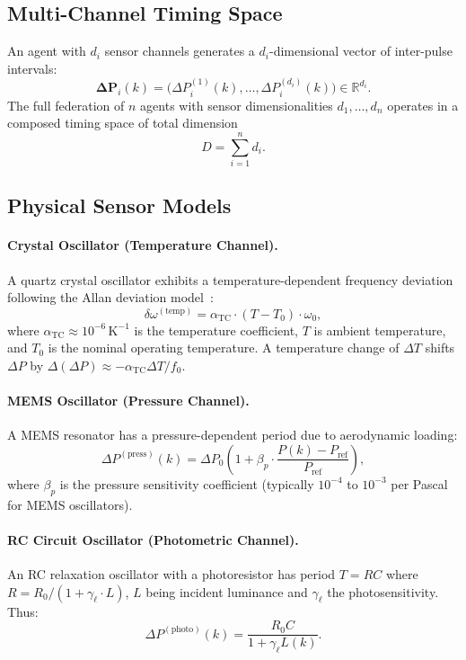 \documentclass[twocolumn,10pt]{article}
\newcommand{\DeltaP}{\Delta P}
\begin{document}
\subsection{Multi-Channel Timing Space}

An agent with $d_i$ sensor channels generates a $d_i$-dimensional vector of
inter-pulse intervals:
\[
  \boldsymbol{\DeltaP}_i(k) =
  \bigl(\DeltaP_i^{(1)}(k), \ldots, \DeltaP_i^{(d_i)}(k)\bigr) \in
  \mathbb{R}^{d_i}.
\]
The full federation of $n$ agents with sensor dimensionalities $d_1, \ldots,
d_n$ operates in a composed timing space of total dimension
\begin{equation}
\label{eq:D}
  D = \sum_{i=1}^{n} d_i.
\end{equation}

\subsection{Physical Sensor Models}

\paragraph{Crystal Oscillator (Temperature Channel).}
A quartz crystal oscillator exhibits a temperature-dependent frequency
deviation following the Allan deviation model~\cite{IEEE1588-2019}:
\[
  \delta\omega^{(\mathrm{temp})} = \alpha_{\mathrm{TC}} \cdot (T - T_0)
  \cdot \omega_0,
\]
where $\alpha_{\mathrm{TC}} \approx 10^{-6}\,\mathrm{K}^{-1}$ is the
temperature coefficient, $T$ is ambient temperature, and $T_0$ is the nominal
operating temperature. A temperature change of $\Delta T$ shifts $\DeltaP$
by $\Delta(\DeltaP) \approx -\alpha_{\mathrm{TC}} \Delta T / f_0$.

\paragraph{MEMS Oscillator (Pressure Channel).}
A MEMS resonator has a pressure-dependent period due to aerodynamic loading:
\[
  \DeltaP^{(\mathrm{press})}(k) = \DeltaP_0 \left(1 + \beta_p \cdot
  \frac{P(k) - P_{\mathrm{ref}}}{P_{\mathrm{ref}}}\right),
\]
where $\beta_p$ is the pressure sensitivity coefficient (typically $10^{-4}$
to $10^{-3}$ per Pascal for MEMS oscillators).

\paragraph{RC Circuit Oscillator (Photometric Channel).}
An RC relaxation oscillator with a photoresistor has period $T = RC$ where
$R = R_0/(1 + \gamma_\ell \cdot L)$, $L$ being incident luminance and
$\gamma_\ell$ the photosensitivity. Thus:
\[
  \DeltaP^{(\mathrm{photo})}(k) = \frac{R_0 C}{1 + \gamma_\ell L(k)}.
\]
\end{document}
